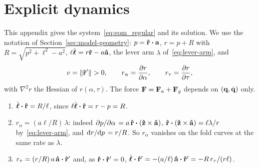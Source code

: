 \section{Explicit dynamics} \label{sec:explicit-ddq}

This appendix gives the system~\eqref{eq:eom_regular} and its solution.
We use the notation of Section~\ref{sec:model-geometry}: \(p = \vu r\vdot\vb a\), \(r = p + R\) with \(R = \sqrt{p^2+\ell^2-a^2}\), \(\ell\hat{\boldsymbol{\ell}} = r\vu r - a\vu a\), the lever arm \(\lambda\) of~\eqref{eq:lever-arm}, and
\begin{equation}
    v = \norm{\vu r'} > 0, \qquad r_\alpha = \pdv{r}{\alpha}, \qquad r_\tau = \pdv{r}{\tau},
\end{equation}
with \(\nabla^2 r\) the Hessian of \(r(\alpha,\tau)\).
The force \(\vb F = \vb F_a + \vb F_g\) depends on \((\vb q, \dot{\vb q})\) only.

\begin{enumerate}
    \item \(\hat{\boldsymbol{\ell}}\vdot\vu r = R/\ell\), since \(\ell\hat{\boldsymbol{\ell}}\vdot\vu r = r - p = R\).
    \item \(r_\alpha = (a\ell/R)\,\lambda\): indeed \(\pdv*{p}{\alpha} = a\,\vu r\vdot(\vu z\times\vu a)\), \(\vu r\vdot(\vu z\times\vu a) = \ell\lambda/r\) by~\eqref{eq:lever-arm}, and \(\dv*{r}{p} = r/R\). So \(r_\alpha\) vanishes on the fold curves at the same rate as \(\lambda\).
    \item \(r_\tau = (r/R)\,a\,\vu a\vdot\vu r'\) and, as \(\vu r\vdot\vu r' = 0\), \(\hat{\boldsymbol{\ell}}\vdot\vu r' = -(a/\ell)\,\vu a\vdot\vu r' = -R\,r_\tau/(r\ell)\).
\end{enumerate}

